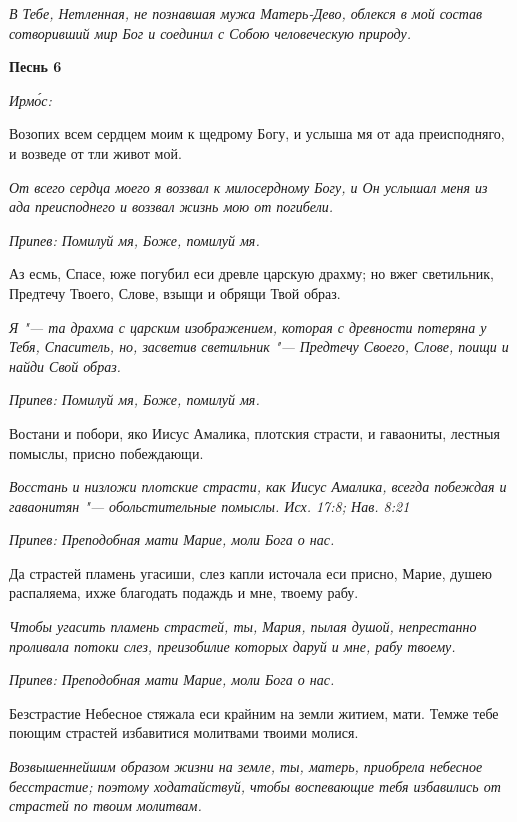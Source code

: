 \itshape В Тебе, Нетленная, не познавшая мужа Матерь-Дево, облекся в мой состав сотворивший мир Бог и соединил с Собою человеческую природу.\normalfont{}





\bfseries Песнь 6\normalfont{}


\itshape Ирмо́с:\normalfont{}


Возопих всем сердцем моим к щедрому Богу, и услыша мя от ада преисподняго, и возведе от тли живот мой.


\itshape От всего сердца моего я воззвал к милосердному Богу, и Он услышал меня из ада преисподнего и воззвал жизнь мою от погибели.\normalfont{}


\itshape Припев:\normalfont{} Помилуй мя, Боже, помилуй мя.


Аз есмь, Спасе, юже погубил еси древле царскую драхму; но вжег светильник, Предтечу Твоего, Слове, взыщи и обрящи Твой образ.


\itshape Я "--- та драхма с царским изображением, которая с древности потеряна у Тебя, Спаситель, но, засветив светильник "--- Предтечу Своего, Слове, поищи и найди Свой образ.\normalfont{}


\itshape Припев:\normalfont{} Помилуй мя, Боже, помилуй мя.


Востани и побори, яко Иисус Амалика, плотския страсти, и гаваониты, лестныя помыслы, присно побеждающи.


\itshape Восстань и низложи плотские страсти, как Иисус Амалика, всегда побеждая и гаваонитян "--- обольстительные помыслы. Исх. 17:8; Нав. 8:21\normalfont{}


\itshape Припев:\normalfont{} Преподобная мати Марие, моли Бога о нас.


Да страстей пламень угасиши, слез капли источала еси присно, Марие, душею распаляема, ихже благодать подаждь и мне, твоему рабу.


\itshape Чтобы угасить пламень страстей, ты, Мария, пылая душой, непрестанно проливала потоки слез, преизобилие которых даруй и мне, рабу твоему.\normalfont{}


\itshape Припев:\normalfont{} Преподобная мати Марие, моли Бога о нас.


Безстрастие Небесное стяжала еси крайним на земли житием, мати. Темже тебе поющим страстей избавитися молитвами твоими молися.


\itshape Возвышеннейшим образом жизни на земле, ты, матерь, приобрела небесное бесстрастие; поэтому ходатайствуй, чтобы воспевающие тебя избавились от страстей по твоим молитвам.\normalfont{}


